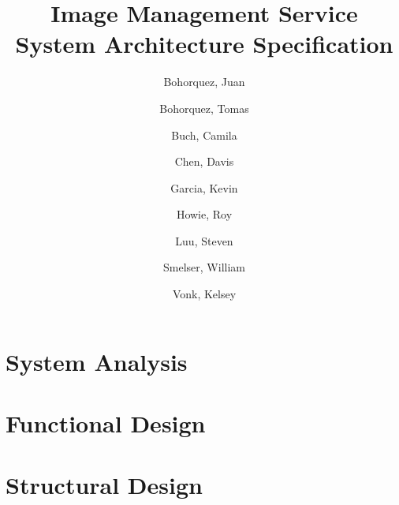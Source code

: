 \documentclass{article}
\begin{document}
\title{
  Image Management Service\\
  \large System Architecture Specification
}
\author{
       Bohorquez, Juan
  \and Bohorquez, Tomas
  \and Buch, Camila
  \and Chen, Davis
  \and Garcia, Kevin
  \and Howie, Roy
  \and Luu, Steven
  \and Smelser, William
  \and Vonk, Kelsey
}
\date{}
\maketitle

\clearpage
  \tableofcontents

\clearpage
  \listoffigures
  \listoftables

\clearpage
\section{System Analysis}
  

\clearpage
\section{Functional Design}
  

\clearpage
\section{Structural Design}
  
\end{document}
